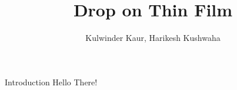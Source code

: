 \documentclass{beamer}
\title{Drop on Thin Film}
\institute[IITD]{Indian Institute of Technology, Delhi}
\author{Kulwinder Kaur, Harikesh Kushwaha}
\begin{document}
\maketitle
\begin{frame}{Introduction}
    Hello There!
    \end{frame}
        
    
\end{document}
